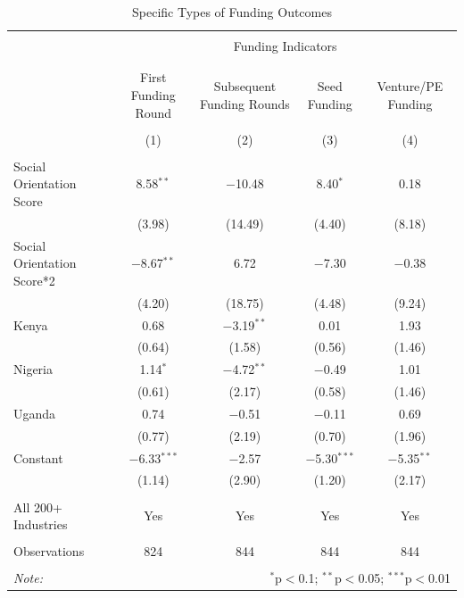 \documentclass[12pt]{article}
\begin{document}
\begin{table}[!htbp] \centering 
  \caption{Specific Types of Funding Outcomes} 
  \label{} 
\scriptsize 
\begin{tabular}{@{\extracolsep{5pt}}lcccc} 
\\[-1.8ex]\hline 
\hline \\[-1.8ex] 
 & \multicolumn{4}{c}{Funding Indicators} \\ 
\cline{2-5} 
\\[-1.8ex] &  &  &  &  \\ 
 & First Funding Round & Subsequent Funding Rounds & Seed Funding & Venture/PE Funding \\ 
\\[-1.8ex] & (1) & (2) & (3) & (4)\\ 
\hline \\[-1.8ex] 
 Social Orientation Score & 8.58$^{**}$ & $-$10.48 & 8.40$^{*}$ & 0.18 \\ 
  & (3.98) & (14.49) & (4.40) & (8.18) \\ 
  Social Orientation Score*2 & $-$8.67$^{**}$ & 6.72 & $-$7.30 & $-$0.38 \\ 
  & (4.20) & (18.75) & (4.48) & (9.24) \\ 
  Kenya & 0.68 & $-$3.19$^{**}$ & 0.01 & 1.93 \\ 
  & (0.64) & (1.58) & (0.56) & (1.46) \\ 
  Nigeria & 1.14$^{*}$ & $-$4.72$^{**}$ & $-$0.49 & 1.01 \\ 
  & (0.61) & (2.17) & (0.58) & (1.46) \\ 
  Uganda & 0.74 & $-$0.51 & $-$0.11 & 0.69 \\ 
  & (0.77) & (2.19) & (0.70) & (1.96) \\ 
  Constant & $-$6.33$^{***}$ & $-$2.57 & $-$5.30$^{***}$ & $-$5.35$^{**}$ \\ 
  & (1.14) & (2.90) & (1.20) & (2.17) \\ 
 \hline \\[-1.8ex] 
 All 200+ Industries & Yes & Yes & Yes & Yes \\ 
  \hline \\[-1.8ex] 
Observations & 824 & 844 & 844 & 844 \\ 
\hline 
\hline \\[-1.8ex] 
\textit{Note:}  & \multicolumn{4}{r}{$^{*}$p$<$0.1; $^{**}$p$<$0.05; $^{***}$p$<$0.01} \\ 
\end{tabular} 
\end{table} 
\end{document}
